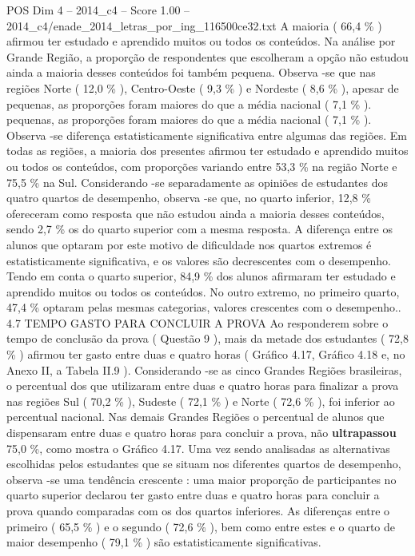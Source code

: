 \begin{textsample}{POS Dim 4 – 2014\_c4 – Score 1.00 – 2014\_c4/enade\_2014\_letras\_por\_ing\_116500ce32.txt}
A maioria ( 66,4 \% ) afirmou ter estudado e aprendido muitos ou todos os conteúdos.
Na análise por Grande Região, a proporção de respondentes que escolheram a opção não estudou ainda a maioria desses conteúdos foi também pequena.
Observa -se que nas regiões Norte ( 12,0 \% ), Centro-Oeste ( 9,3 \% ) e Nordeste ( 8,6 \% ), apesar de pequenas, as proporções foram maiores do que a média nacional ( 7,1 \% ). pequenas, as proporções foram maiores do que a média nacional ( 7,1 \% ).
Observa -se diferença estatisticamente significativa entre algumas das regiões.
Em todas as regiões, a maioria dos presentes afirmou ter estudado e aprendido muitos ou todos os conteúdos, com proporções variando entre 53,3 \% na região Norte e 75,5 \% na Sul.
Considerando -se separadamente as opiniões de estudantes dos quatro quartos de desempenho, observa -se que, no quarto inferior, 12,8 \% ofereceram como resposta que não estudou ainda a maioria desses conteúdos, sendo 2,7 \% os do quarto superior com a mesma resposta.
A diferença entre os alunos que optaram por este motivo de dificuldade nos quartos extremos é estatisticamente significativa, e os valores são decrescentes com o desempenho.
Tendo em conta o quarto superior, 84,9 \% dos alunos afirmaram ter estudado e aprendido muitos ou todos os conteúdos.
No outro extremo, no primeiro quarto, 47,4 \% optaram pelas mesmas categorias, valores crescentes com o desempenho.. 4.7 TEMPO GASTO PARA CONCLUIR A PROVA Ao responderem sobre o tempo de conclusão da prova ( Questão 9 ), mais da metade dos estudantes ( 72,8 \% ) afirmou ter gasto entre duas e quatro horas ( Gráfico 4.17, Gráfico 4.18 e, no Anexo II, a Tabela II.9 ).
Considerando -se as cinco Grandes Regiões brasileiras, o percentual dos que utilizaram entre duas e quatro horas para finalizar a prova nas regiões Sul ( 70,2 \% ), Sudeste ( 72,1 \% ) e Norte ( 72,6 \% ), foi inferior ao percentual nacional.
Nas demais Grandes Regiões o percentual de alunos que dispensaram entre duas e quatro horas para concluir a prova, não \textbf{ultrapassou} 75,0 \%, como mostra o Gráfico 4.17.
Uma vez sendo analisadas as alternativas escolhidas pelos estudantes que se situam nos diferentes quartos de desempenho, observa -se uma tendência crescente : uma maior proporção de participantes no quarto superior declarou ter gasto entre duas e quatro horas para concluir a prova quando comparadas com os dos quartos inferiores.
As diferenças entre o primeiro ( 65,5 \% ) e o segundo ( 72,6 \% ), bem como entre estes e o quarto de maior desempenho ( 79,1 \% ) são estatisticamente significativas.

\end{textsample}
